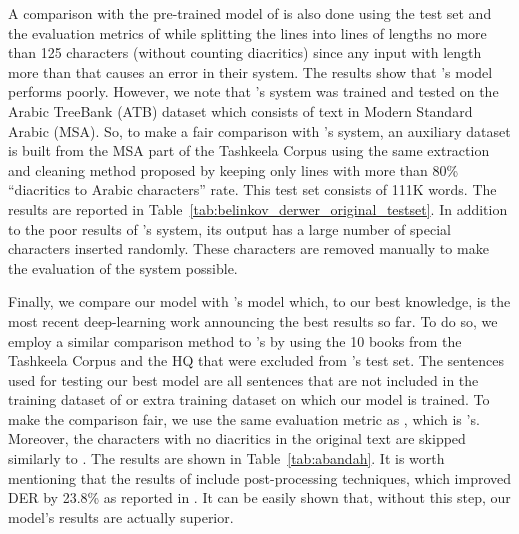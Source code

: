 \documentclass[11pt,a4paper]{article}
\begin{document}
A comparison with the pre-trained model of \cite{belinkov2015arabic} is also done using the test set and the evaluation metrics of \cite{dataset} while splitting the lines into lines of lengths no more than 125 characters (without counting diacritics) since any input with length more than that causes an error in their system. The results show that \cite{belinkov2015arabic}'s model performs poorly.
However, we note that \cite{belinkov2015arabic}'s system  was trained and tested on the Arabic TreeBank (ATB) dataset which consists of text in Modern Standard Arabic (MSA). So, to make a fair comparison with \cite{belinkov2015arabic}'s system, an auxiliary dataset is built from the MSA part of the Tashkeela Corpus using the same extraction and cleaning method proposed by \cite{dataset} keeping only lines with more than 80\% ``diacritics to Arabic characters'' rate. This test set consists of 111K words. The results are reported in Table~\ref{tab:belinkov_derwer_original_testset}.
In addition to the poor results of \cite{belinkov2015arabic}'s system, its output has a large number of special characters inserted randomly. These characters are removed manually to make the evaluation of the system possible.

Finally, we compare our model with \cite{abandah2015automatic}'s model which, to our best knowledge, is the most recent deep-learning work announcing the best results so far. To do so, we employ a similar comparison method to \cite{chennoufi2017morphological}'s by using the 10 books from the Tashkeela Corpus and the HQ
that were excluded from \cite{abandah2015automatic}'s test set. The sentences used for testing our best model are all sentences that are not included in the training dataset of \cite{dataset} or extra training dataset on which our model is trained. To make the comparison fair, we use the same evaluation metric as \cite{abandah2015automatic}, which is \cite{zitouni2009arabic}'s. Moreover, the characters with no diacritics in the original text are skipped similarly to \cite{abandah2015automatic}. The results are shown in Table~\ref{tab:abandah}.
It is worth mentioning that the results of \cite{abandah2015automatic} include post-processing techniques, which improved DER by 23.8\% as reported in \cite{abandah2015automatic}. It can be easily shown that, without this step, our model's results are actually superior.
\end{document}

